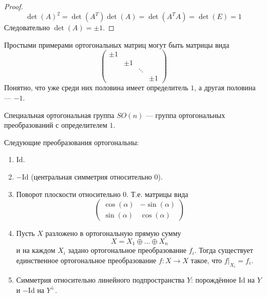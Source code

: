 \documentclass[12pt,a4paper]{article}
\newcommand{\Id}{\ensuremath{\mathrm{Id}}\xspace}
\begin{document}
    \begin{proof}
        \[\det(A)^2 = \det(A^T)\det(A) = \det(A^T A) = \det(E) = 1\]
        Следовательно $\det(A) = \pm 1$.
    \end{proof}

    \begin{example}
        Простыми примерами ортогональных матриц могут быть матрицы вида
        \[
            \begin{pmatrix}
                \pm 1\\
                & \pm 1\\
                && \ddots\\
                &&& \pm 1
            \end{pmatrix}
        \]
        Понятно, что уже среди них половина имеет определитель $1$, а другая половина --- $-1$.
    \end{example}

    \begin{definition}
        Специальная ортогональная группа $SO(n)$ --- группа ортогональных преобразований с определителем $1$.
    \end{definition}

    \begin{example}
        Следующие преобразования ортогональны:
        \begin{enumerate}
            \item $\Id$.
            \item $-\Id$ (центральная симметрия относительно $0$).
            \item Поворот плоскости относительно $0$. Т.е. матрицы вида
                \[
                    \begin{pmatrix}
                        \cos(\alpha)& -\sin(\alpha)\\
                        \sin(\alpha)& \cos(\alpha)
                    \end{pmatrix}
                \]
            \item Пусть $X$ разложено в ортогональную прямую сумму
                \[X = X_1 \oplus \dots \oplus X_n\]
                и на каждом $X_i$ задано ортогональное преобразование $f_i$. Тогда существует единственное ортогональное преобразование $f: X \to X$ такое, что $f|_{X_i} = f_i$.
            \item Симметрия относительно линейного подпространства $Y$: порождённое $\Id$ на $Y$ и $-\Id$ на $Y^\perp$.
        \end{enumerate}
    \end{example}
\end{document}

